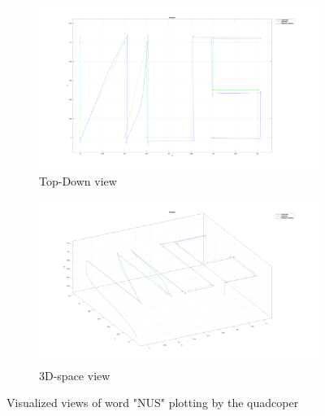 \documentclass[12pt]{article}
\begin{document}
\begin{figure}[H]
    \centering
    \begin{subfigure}{.45\textwidth}
        \centering
        \includegraphics[width=\linewidth]{figures/nus_word_top_down_view}
        \caption{Top-Down view}
        \label{fig:nus_word_top_down_view}
    \end{subfigure}
    \hspace{.05\textwidth}  %
    \begin{subfigure}{.45\textwidth}
        \centering
        \includegraphics[width=\linewidth]{figures/nus_word_3d_space_view}
        \caption{3D-space view}
        \label{fig:nus_word_3d_space_view}
    \end{subfigure}
    \caption{Visualized views of word "NUS" plotting by the quadcoper}
    \label{fig:nus_word_views}
\end{figure}
\end{document}
